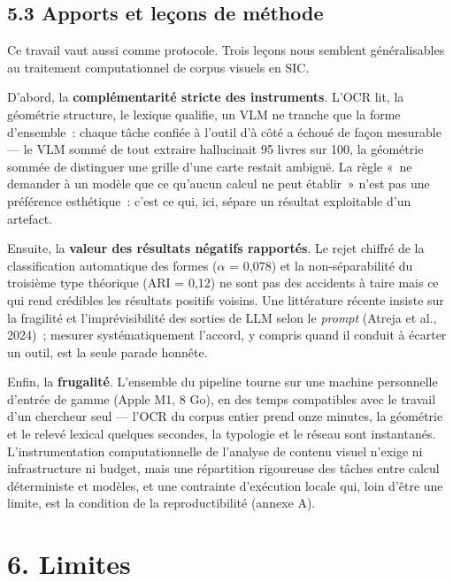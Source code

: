 \documentclass[11pt,a4paper]{article}
\begin{document}
\subsection*{5.3 Apports et leçons de méthode}

Ce travail vaut aussi comme protocole. Trois leçons nous semblent généralisables au traitement computationnel de corpus visuels en SIC.

D'abord, la \textbf{complémentarité stricte des instruments}. L'OCR lit, la géométrie structure, le lexique qualifie, un VLM ne tranche que la forme d'ensemble~: chaque tâche confiée à l'outil d'à côté a échoué de façon mesurable --- le VLM sommé de tout extraire hallucinait 95 livres sur 100, la géométrie sommée de distinguer une grille d'une carte restait ambiguë. La règle «~ne demander à un modèle que ce qu'aucun calcul ne peut établir~» n'est pas une préférence esthétique~: c'est ce qui, ici, sépare un résultat exploitable d'un artefact.

Ensuite, la \textbf{valeur des résultats négatifs rapportés}. Le rejet chiffré de la classification automatique des formes ($\alpha$ = 0,078) et la non-séparabilité du troisième type théorique (ARI = 0,12) ne sont pas des accidents à taire mais ce qui rend crédibles les résultats positifs voisins. Une littérature récente insiste sur la fragilité et l'imprévisibilité des sorties de LLM selon le \emph{prompt} (Atreja et al., 2024)~; mesurer systématiquement l'accord, y compris quand il conduit à écarter un outil, est la seule parade honnête.

Enfin, la \textbf{frugalité}. L'ensemble du pipeline tourne sur une machine personnelle d'entrée de gamme (Apple M1, 8 Go), en des temps compatibles avec le travail d'un chercheur seul --- l'OCR du corpus entier prend onze minutes, la géométrie et le relevé lexical quelques secondes, la typologie et le réseau sont instantanés. L'instrumentation computationnelle de l'analyse de contenu visuel n'exige ni infrastructure ni budget, mais une répartition rigoureuse des tâches entre calcul déterministe et modèles, et une contrainte d'exécution locale qui, loin d'être une limite, est la condition de la reproductibilité (annexe A).

\section*{6. Limites}
\end{document}
